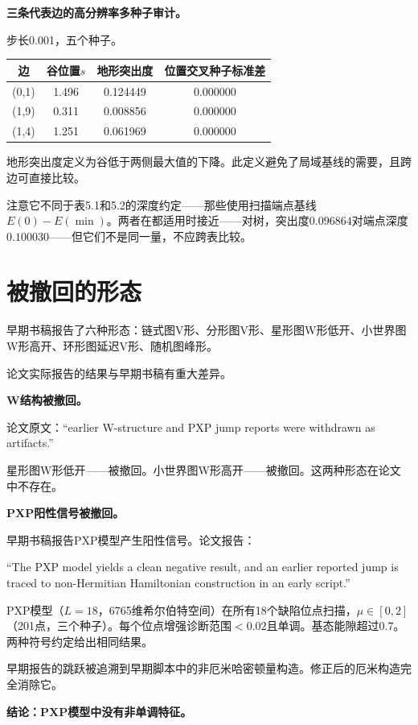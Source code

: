 \documentclass[11pt,a4paper]{book}
\theoremstyle{definition}
\begin{document}
\textbf{三条代表边的高分辨率多种子审计。}

步长0.001，五个种子。

\begin{table}[h]
\centering
\begin{tabular}{cccc}
\toprule
边 & 谷位置$s$ & 地形突出度 & 位置交叉种子标准差 \\
\midrule
(0,1) & 1.496 & 0.124449 & 0.000000 \\
(1,9) & 0.311 & 0.008856 & 0.000000 \\
(1,4) & 1.251 & 0.061969 & 0.000000 \\
\bottomrule
\end{tabular}
\end{table}

地形突出度定义为谷低于两侧最大值的下降。此定义避免了局域基线的需要，且跨边可直接比较。

注意它不同于表5.1和5.2的深度约定——那些使用扫描端点基线$E(0)-E(\min)$。两者在都适用时接近——对树，突出度$0.096864$对端点深度$0.100030$——但它们不是同一量，不应跨表比较。

\section{被撤回的形态}

早期书稿报告了六种形态：链式图V形、分形图V形、星形图W形低开、小世界图W形高开、环形图延迟V形、随机图峰形。

论文实际报告的结果与早期书稿有重大差异。

\textbf{W结构被撤回。}

论文原文：“earlier W-structure and PXP jump reports were withdrawn as artifacts.”

星形图W形低开——被撤回。小世界图W形高开——被撤回。这两种形态在论文中不存在。

\textbf{PXP阳性信号被撤回。}

早期书稿报告PXP模型产生阳性信号。论文报告：

“The PXP model yields a clean negative result, and an earlier reported jump is traced to non-Hermitian Hamiltonian construction in an early script.”

PXP模型（$L=18$，6765维希尔伯特空间）在所有18个缺陷位点扫描，$\mu\in[0,2]$（201点，三个种子）。每个位点增强诊断范围$<0.02$且单调。基态能隙超过$0.7$。两种符号约定给出相同结果。

早期报告的跳跃被追溯到早期脚本中的非厄米哈密顿量构造。修正后的厄米构造完全消除它。

\textbf{结论：PXP模型中没有非单调特征。}
\end{document}

